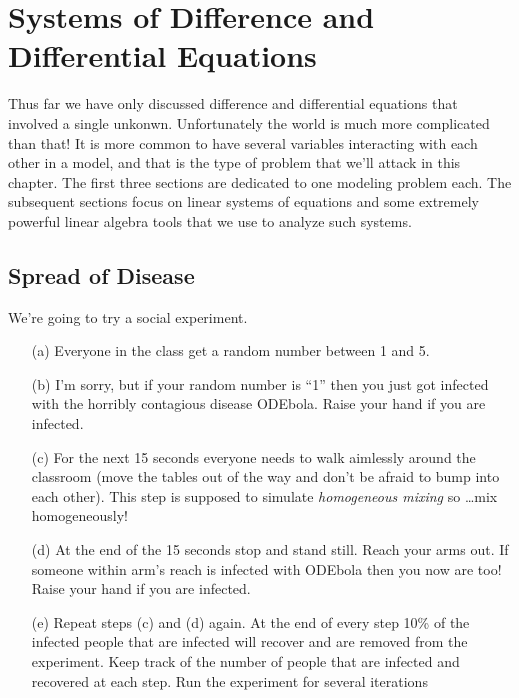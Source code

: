 \chapter{Systems of Difference and Differential Equations}
Thus far we have only discussed difference and differential equations that involved a
single unkonwn.  Unfortunately the world is much more complicated than that!  It is more
common to have several variables interacting with each other in a model, and that is the
type of problem that we'll attack in this chapter.  The first three sections are dedicated
to one modeling problem each.  The subsequent sections focus on linear systems of
equations and some extremely powerful linear algebra tools that we use to analyze such
systems.

\section{Spread of Disease}
\begin{problem}
    We're going to try a social experiment.  
    \begin{enumerate}
        \item[(a)] Everyone in the class get a random number between 1 and 5. 
        \item[(b)] I'm sorry, but if your random number is ``1'' then you just got infected
            with the horribly contagious disease ODEbola.  Raise your hand if you are
            infected.
        \item[(c)] For the next 15 seconds everyone needs to walk aimlessly around the
            classroom (move the tables out of the way and don't be afraid to bump into
            each other).  This step is supposed to simulate {\it homogeneous mixing} so
            \ldots mix homogeneously!
        \item[(d)] At the end of the 15 seconds stop and stand still.  Reach your arms
            out.  If someone within arm's reach is infected with ODEbola then you now are
            too!  Raise your hand if you are infected.
        \item[(e)] Repeat steps (c) and (d) again. At the end of every step 10\% of the
            infected people that are infected will recover and are removed from the
            experiment.  Keep track of the number of
            people that are infected and recovered at each step.  Run the experiment for
            several iterations
    \end{enumerate}
\end{problem}

